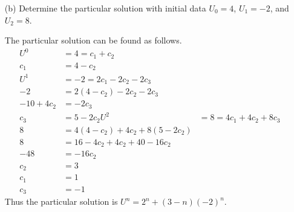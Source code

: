 \documentclass[11pt, oneside, titlepage]{article}
\begin{document}
\begin{enumerate}
\begin{enumerate}
            \item[(b)]
                Determine the particular solution with initial data $U_0 = 4$,
                $U_1 = -2$, and $U_2 = 8$.

                The particular solution can be found as follows.
                \begin{align*}
                    U^0 &= 4 = c_1 + c_2 \\
                    c_1 &= 4 - c_2 \\
                    U^1 &= -2 = 2 c_1 - 2 c_2 - 2c_3 \\
                    -2 &= 2(4 - c_2) - 2 c_2 - 2 c_3 \\
                    -10 + 4 c_2 &= -2 c_3 \\
                    c_3 &= 5 - 2 c_2
                    U^2 &= 8 = 4c_1 + 4c_2 + 8c_3 \\
                    8 &= 4(4 - c_2) + 4c_2 + 8(5 - 2c_2) \\
                    8 &= 16 - 4c_2 + 4c_2 + 40 - 16c_2 \\
                    -48 &= -16c_2 \\
                    c_2 &= 3 \\
                    c_1 &= 1 \\
                    c_3 &= -1 
                \end{align*}
                Thus the particular solution is $U^n = 2^n + (3 - n)(-2)^n$.


\end{enumerate}
\end{enumerate}
\end{document}
